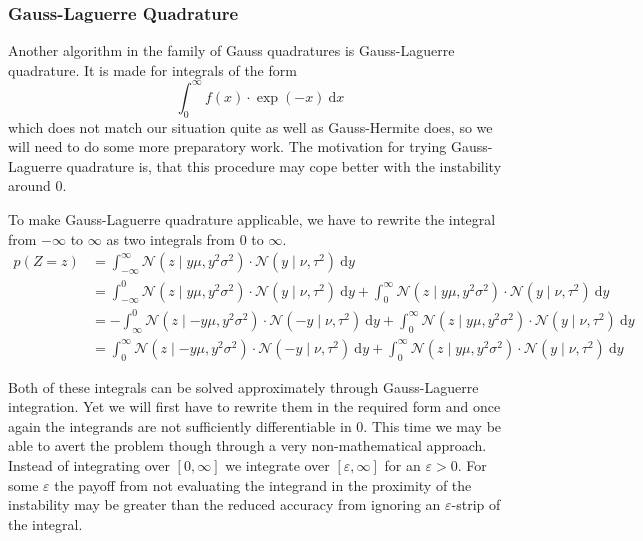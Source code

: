 \documentclass[11pt,a4paper]{book}
\begin{document}
\subsubsection{Gauss-Laguerre Quadrature}

Another algorithm in the family of Gauss quadratures is Gauss-Laguerre
quadrature. It is made for integrals of the form
\begin{equation*}
  \int_{0}^{\infty} f(x) \cdot \exp(-x)~\mathrm{d}x
\end{equation*}
which does not match our situation quite as well as Gauss-Hermite does, so we
will need to do some more preparatory work. The motivation for trying
Gauss-Laguerre quadrature is, that this procedure may cope better with the
instability around $0$.

To make Gauss-Laguerre quadrature applicable, we have to rewrite the integral
from $-\infty$ to $\infty$ as two integrals from $0$ to $\infty$.
\begin{align*}
  p(Z = z) & = \int_{-\infty}^{\infty} \mathcal{N}\left( z \mid y\mu, y^{2}\sigma^{2} \right) \cdot \mathcal{N}(y \mid \nu, \tau^{2})~\mathrm{d}y\\
           & = \int_{-\infty}^{0} \mathcal{N}\left( z \mid y\mu, y^{2}\sigma^{2} \right) \cdot \mathcal{N}(y \mid \nu, \tau^{2})~\mathrm{d}y + \int_{0}^{\infty} \mathcal{N}\left( z \mid y\mu, y^{2}\sigma^{2} \right) \cdot \mathcal{N}(y \mid \nu, \tau^{2})~\mathrm{d}y\\
           & = -\int_{\infty}^{0} \mathcal{N}\left( z \mid -y\mu, y^{2}\sigma^{2} \right) \cdot \mathcal{N}(-y \mid \nu, \tau^{2})~\mathrm{d}y + \int_{0}^{\infty} \mathcal{N}\left( z \mid y\mu, y^{2}\sigma^{2} \right) \cdot \mathcal{N}(y \mid \nu, \tau^{2})~\mathrm{d}y\\
           & = \int_{0}^{\infty} \mathcal{N}\left( z \mid -y\mu, y^{2}\sigma^{2} \right) \cdot \mathcal{N}(-y \mid \nu, \tau^{2})~\mathrm{d}y + \int_{0}^{\infty} \mathcal{N}\left( z \mid y\mu, y^{2}\sigma^{2} \right) \cdot \mathcal{N}(y \mid \nu, \tau^{2})~\mathrm{d}y
\end{align*}

Both of these integrals can be solved approximately through Gauss-Laguerre
integration. Yet we will first have to rewrite them in the required form and
once again the integrands are not sufficiently differentiable in $0$. This time
we may be able to avert the problem though through a very non-mathematical
approach. Instead of integrating over $[0, \infty]$ we integrate over
$[\varepsilon, \infty]$ for an $\varepsilon > 0$. For some $\varepsilon$ the
payoff from not evaluating the integrand in the proximity of the instability may
be greater than the reduced accuracy from ignoring an $\varepsilon$-strip of the
integral.
\end{document}

